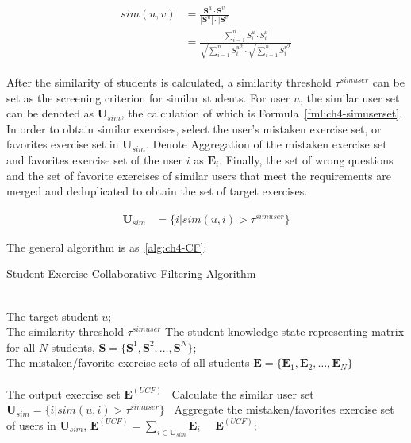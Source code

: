 \begin{align}\label{fml:ch4-user_similarity}
  \begin{split}
    sim(u, v) & =\frac{\mathbf{S}^u \cdot \mathbf{S}^v}{|\mathbf{S}^u|\cdot |\mathbf{S}^v}                                                                 \\
    & =\frac{\sum\limits_{i = 1}^{n}{S^u_i\cdot S^v_i}}{\sqrt{\sum\limits_{i = 1}^{n}{{S^u_i}^2}}\cdot\sqrt{\sum\limits_{i = 1}^{n}{{S^v_i}^2}}}
  \end{split}
\end{align}

After the similarity of students is calculated, a similarity threshold \(\tau^{simuser}\) can be set as the screening criterion for similar students. For user \(u\), the similar user set can be denoted as \(\mathbf{U}_{sim}\), the calculation of which is Formula~\ref{fml:ch4-simuserset}. In order to obtain similar exercises, select the user's mistaken exercise set, or favorites exercise set in \(\mathbf{U}_{sim}\). Denote Aggregation of the mistaken exercise set and favorites exercise set of the user \(i\) as \(\mathbf{E}_{i}\). Finally, the set of wrong questions and the set of favorite exercises of similar users that meet the requirements are merged and deduplicated to obtain the set of target exercises.

\begin{align}
  \mathbf{U}_{sim} & =\{i|sim(u,i)>\tau^{simuser}\}  \label{fml:ch4-simuserset}
\end{align}

The general algorithm is as~\ref{alg:ch4-CF}:
\begin{algorithm}[htbp!]
  \caption{Student-Exercise Collaborative Filtering Algorithm}\label{alg:ch4-CF}
  \begin{algorithmic}
    \REQUIRE~~\\
    The target student \(u\); \\
    The similarity threshold \(\tau^{simuser}\)
    The student knowledge state representing matrix for all \(N\) students, \(\mathbf{S}=\{\mathbf{S}^1,\mathbf{S}^2,\ldots,\mathbf{S}^N\} \);\\
    The mistaken/favorite exercise sets of all students \( \mathbf{E}=\{\mathbf{E}_1,\mathbf{E}_2,\ldots,\mathbf{E}_N\} \) \\
    \ENSURE~~\\ %
    The output exercise set \(\mathbf{E}^{(UCF)} \)
    \STATE~Calculate the similar user set \(\mathbf{U}_{sim}=\{i|sim(u,i)>\tau^{simuser}\}  \)
    \STATE~Aggregate the mistaken/favorites exercise set of users in \(\mathbf{U}_{sim}\), \(\mathbf{E}^{(UCF)}=\sum\limits_{i \in \mathbf{U}_{sim}}{\mathbf{E}_{i}}\)
    \RETURN~~\(\mathbf{E}^{(UCF)} \); %
  \end{algorithmic}
\end{algorithm}

